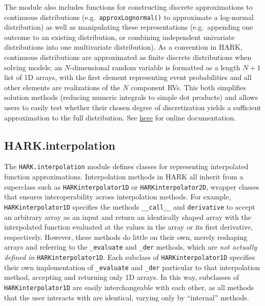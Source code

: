 \documentclass[12pt,titlepage,letterpaper]{econtex}
\begin{document}
{The module also includes functions for constructing discrete approximations to continuous distributions (e.g.\ \texttt{approxLognormal()} to approximate a log-normal distribution) as well as manipulating these representations (e.g.\ appending one outcome to an existing distribution, or combining independent univariate distributions into one multivariate distribution).  As a convention in HARK, continuous distributions are approximated as finite discrete distributions when solving models; an $N$-dimensional random variable is formatted as a length $N+1$ list of 1D arrays, with the first element representing event probabilities and all other elements are realizations of the $N$ component RVs.  This both simplifies solution methods (reducing numeric integrals to simple dot products) and allows users to easily test whether their chosen degree of discretization yields a sufficient approximation to the full distribution.  See \href{https://hark.readthedocs.io/en/latest/generated/HARK.utilities.html}{here} for online documentation.

\subsection{HARK.interpolation}\label{sec:HARKinterpolation}

The \texttt{HARK.interpolation} module defines classes for representing interpolated function approximations.  Interpolation methods in HARK all inherit from a superclass such as \texttt{HARKinterpolator1D} or \texttt{HARKinterpolator2D}, wrapper classes that ensures interoperability across interpolation methods.  For example, \texttt{HARKinterpolator1D} specifies the methods \texttt{\_\_call\_\_} and \texttt{derivative} to accept an arbitrary array as an input and return an identically shaped array with the interpolated function evaluated at the values in the array or its first derivative, respectively.  However, these methods do little on their own, merely reshaping arrays and referring to the \texttt{\_evaluate} and \texttt{\_der} methods, which are \textit{not actually defined in} \texttt{HARKinterpolator1D}.  Each subclass of \texttt{HARKinterpolator1D} specifies their own implementation of \texttt{\_evaluate} and \texttt{\_der} particular to that interpolation method, accepting and returning only 1D arrays.  In this way, subclasses of \texttt{HARKinterpolator1D} are easily interchangeable with each other, as all methods that the user interacts with are identical, varying only by ``internal'' methods.

}
\end{document}
